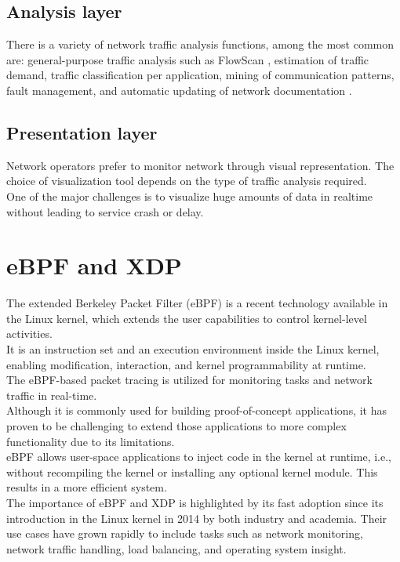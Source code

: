 \subsection{Analysis layer}
There is a variety of network traffic analysis functions, among the most common are:
general-purpose traffic analysis such as FlowScan \cite{plonka2000flowscan}, estimation of traffic demand, traffic classification per application, mining of communication patterns,
fault management, and automatic updating of network documentation \cite{LEE201484}.\\

\subsection{Presentation layer}
Network operators prefer to monitor network through visual representation. The choice of visualization tool depends on the type of
traffic analysis required.\\
One of the major challenges is to visualize huge amounts of data in realtime without leading to service crash or delay.

\section{eBPF and XDP}
The extended Berkeley Packet Filter (eBPF) is a recent technology available in the Linux kernel, which extends the user capabilities to control kernel-level activities.\\
It is an instruction set and an execution environment inside the Linux kernel, enabling modification, interaction, and kernel programmability at runtime.\\
The eBPF-based packet tracing is utilized for monitoring tasks and network traffic in real-time.\\
Although it is commonly used for building proof-of-concept applications,
it has proven to be challenging to extend those applications to more complex functionality due to its limitations\cite{8850758}.\\
eBPF allows user-space applications to inject code in the kernel at runtime, i.e., without recompiling the kernel or installing
any optional kernel module. This results in a more efficient system.\\

The importance of eBPF and XDP is highlighted by its fast adoption since its introduction in the Linux kernel
in 2014 by both industry and academia. Their use cases have grown rapidly to include tasks such as network monitoring,
network traffic handling, load balancing, and operating system insight.\\

